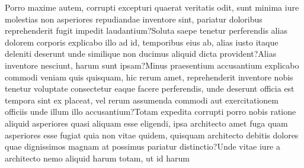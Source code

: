\documentclass[letterpaper]{article} %
\begin{document}
Porro maxime autem, corrupti excepturi quaerat veritatis odit, sunt minima iure molestias non asperiores repudiandae inventore sint, pariatur doloribus reprehenderit fugit impedit laudantium?Soluta saepe tenetur perferendis alias dolorem corporis explicabo illo ad id, temporibus eius ab, alias iusto itaque deleniti deserunt unde similique non ducimus aliquid dicta provident?Alias inventore nesciunt, harum sunt ipsam?Minus praesentium accusantium explicabo commodi veniam quis quisquam, hic rerum amet, reprehenderit inventore nobis tenetur voluptate consectetur eaque facere perferendis, unde deserunt officia est tempora sint ex placeat, vel rerum assumenda commodi aut exercitationem officiis unde illum illo accusantium?Totam expedita corrupti porro nobis ratione aliquid asperiores quasi aliquam esse eligendi, ipsa architecto amet fuga quam asperiores esse fugiat quia non vitae quidem, quisquam architecto debitis dolores quae dignissimos magnam at possimus pariatur distinctio?Unde vitae iure a architecto nemo aliquid harum totam, ut id harum

\end{document}
